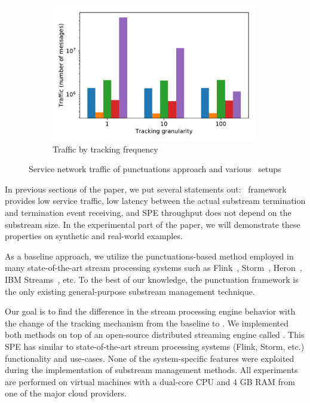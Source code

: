\begin{figure}[t!]
\begin{subfigure}[b]{0.32\textwidth}
            \includegraphics[width=0.99\textwidth]{pics/traffic_by_tracking_frequency_bars.pdf}
            \caption{Traffic by tracking frequency}
            \label{traffic_granularity}
    \end{subfigure}
    \caption{Service network traffic of punctuations approach and various \tracker\ setups}
    \label{traffic_plots}
\end{figure}
In previous sections of the paper, we put several statements out: \tracker\ framework provides low service traffic, low latency between the actual substream termination and termination event receiving, and SPE throughput does not depend on the substream size. In the experimental part of the paper, we will demonstrate these properties on synthetic and real-world examples. 

As a baseline approach, we utilize the punctuations-based method employed in many state-of-the-art stream processing systems such as Flink~\cite{Carbone:2017:SMA:3137765.3137777}, Storm~\cite{apache:storm:state}, Heron~\cite{Kulkarni:2015:THS:2723372.2742788}, IBM Streams~\cite{jacques2016consistent}, etc. To the best of our knowledge, the punctuation framework is the only existing general-purpose substream management technique.

Our goal is to find the difference in the stream processing engine behavior with the change of the tracking mechanism from the baseline to \tracker. We implemented both methods on top of an open-source distributed streaming engine called \FlameStream. This SPE has similar to state-of-the-art stream processing systems (Flink, Storm, etc.) functionality and use-cases. None of the system-specific features were exploited during the implementation of substream management methods. All experiments are performed on virtual machines with a dual-core CPU and 4 GB RAM from one of the major cloud providers. 


